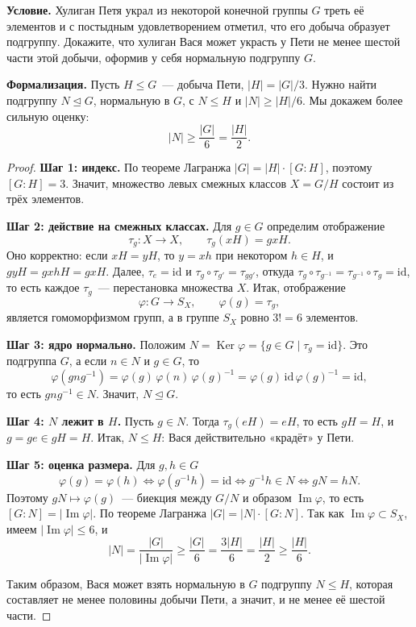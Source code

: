 \documentclass[12pt]{article}
\begin{document}
	\noindent
	\textbf{Условие.} Хулиган Петя украл из некоторой конечной группы $G$ треть её элементов и с постыдным удовлетворением отметил, что его добыча образует подгруппу. Докажите, что хулиган Вася может украсть у Пети не менее шестой части этой добычи, оформив у себя нормальную подгруппу $G$.

	\medskip
	\noindent
	\textbf{Формализация.} Пусть $H \leqslant G$~--- добыча Пети, $|H| = |G|/3$. Нужно найти подгруппу $N \trianglelefteq G$, нормальную в $G$, с $N \leqslant H$ и $|N| \geqslant |H|/6$. Мы докажем более сильную оценку:
	\[
		|N| \geqslant \frac{|G|}{6} = \frac{|H|}{2}.
	\]

	\begin{proof}
		\textbf{Шаг 1: индекс.} По теореме Лагранжа $|G| = |H| \cdot [G : H]$, поэтому $[G : H] = 3$. Значит, множество левых смежных классов $X = G/H$ состоит из трёх элементов.

		\medskip
		\noindent
		\textbf{Шаг 2: действие на смежных классах.} Для $g \in G$ определим отображение
		\[
			\tau_g: X \to X, \qquad \tau_g(xH) = gxH.
		\]
		Оно корректно: если $xH = yH$, то $y = xh$ при некотором $h \in H$, и $gyH = gxhH = gxH$. Далее, $\tau_e = \mathrm{id}$ и $\tau_g \circ \tau_{g'} = \tau_{gg'}$, откуда $\tau_g \circ \tau_{g^{-1}} = \tau_{g^{-1}} \circ \tau_g = \mathrm{id}$, то есть каждое $\tau_g$~--- перестановка множества $X$. Итак, отображение
		\[
			\varphi: G \to S_X, \qquad \varphi(g) = \tau_g,
		\]
		является гомоморфизмом групп, а в группе $S_X$ ровно $3! = 6$ элементов.

		\medskip
		\noindent
		\textbf{Шаг 3: ядро нормально.} Положим $N = \operatorname{Ker}\varphi = \{ g \in G \mid \tau_g = \mathrm{id} \}$. Это подгруппа $G$, а если $n \in N$ и $g \in G$, то
		\[
			\varphi(gng^{-1}) = \varphi(g)\,\varphi(n)\,\varphi(g)^{-1} = \varphi(g)\,\mathrm{id}\,\varphi(g)^{-1} = \mathrm{id},
		\]
		то есть $gng^{-1} \in N$. Значит, $N \trianglelefteq G$.

		\medskip
		\noindent
		\textbf{Шаг 4: $N$ лежит в $H$.} Пусть $g \in N$. Тогда $\tau_g(eH) = eH$, то есть $gH = H$, и $g = ge \in gH = H$. Итак, $N \leqslant H$: Вася действительно «крадёт» у Пети.

		\medskip
		\noindent
		\textbf{Шаг 5: оценка размера.} Для $g, h \in G$
		\[
			\varphi(g) = \varphi(h) \iff \varphi(g^{-1}h) = \mathrm{id} \iff g^{-1}h \in N \iff gN = hN.
		\]
		Поэтому $gN \mapsto \varphi(g)$~--- биекция между $G/N$ и образом $\operatorname{Im}\varphi$, то есть $[G : N] = |\operatorname{Im}\varphi|$. По теореме Лагранжа $|G| = |N| \cdot [G : N]$. Так как $\operatorname{Im}\varphi \subset S_X$, имеем $|\operatorname{Im}\varphi| \leqslant 6$, и
		\[
			|N| = \frac{|G|}{|\operatorname{Im}\varphi|} \geqslant \frac{|G|}{6} = \frac{3|H|}{6} = \frac{|H|}{2} \geqslant \frac{|H|}{6}.
		\]

		Таким образом, Вася может взять нормальную в $G$ подгруппу $N \leqslant H$, которая составляет не менее половины добычи Пети, а значит, и не менее её шестой части.
	\end{proof}
\end{document}
